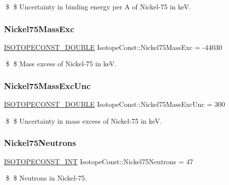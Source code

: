 \$ \$ Uncertainty in binding energy per A of Nickel-\/75 in keV. \mbox{\label{group___isotope_const-_nickel-_ni75_gaeac1a0605e80f4172bed59038c52537e}} 
\subsubsection{\texorpdfstring{Nickel75\+Mass\+Exc}{Nickel75MassExc}}
{\footnotesize\ttfamily \mbox{\hyperlink{group___isotope_const-_macros_ga8f45a7272ce02c0b4c65c44636ed719a}{I\+S\+O\+T\+O\+P\+E\+C\+O\+N\+S\+T\+\_\+\+D\+O\+U\+B\+LE}} Isotope\+Const\+::\+Nickel75\+Mass\+Exc = -\/44030}

\$ \$ Mass excess of Nickel-\/75 in keV. \mbox{\label{group___isotope_const-_nickel-_ni75_ga7311f914cf57eefa0b2e3a11b83e95d6}} 
\subsubsection{\texorpdfstring{Nickel75\+Mass\+Exc\+Unc}{Nickel75MassExcUnc}}
{\footnotesize\ttfamily \mbox{\hyperlink{group___isotope_const-_macros_ga8f45a7272ce02c0b4c65c44636ed719a}{I\+S\+O\+T\+O\+P\+E\+C\+O\+N\+S\+T\+\_\+\+D\+O\+U\+B\+LE}} Isotope\+Const\+::\+Nickel75\+Mass\+Exc\+Unc = 300}

\$ \$ Uncertainty in mass excess of Nickel-\/75 in keV. \mbox{\label{group___isotope_const-_nickel-_ni75_gad663100dddc8d603b14e408bc8319a1f}} 
\subsubsection{\texorpdfstring{Nickel75\+Neutrons}{Nickel75Neutrons}}
{\footnotesize\ttfamily \mbox{\hyperlink{group___isotope_const-_macros_ga5f18360b3e99483a35c32d789e62621c}{I\+S\+O\+T\+O\+P\+E\+C\+O\+N\+S\+T\+\_\+\+I\+NT}} Isotope\+Const\+::\+Nickel75\+Neutrons = 47}

\$ \$ Neutrons in Nickel-\/75. \mbox{\label{group___isotope_const-_nickel-_ni75_gae4ce79b6303039934c8fd53e90ab9c1d}} 
